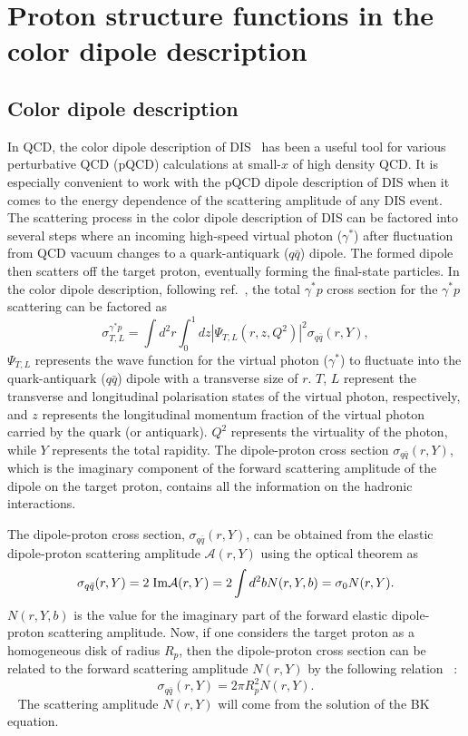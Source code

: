 \documentclass[12pt]{article}
\begin{document}
\section{Proton structure functions in the color dipole description}\label{sec:color}

\subsection{Color dipole description}
In QCD, the color dipole description of DIS~\cite{ad,ae,af} has been a useful tool for various perturbative QCD (pQCD) calculations at small-$x$ of high density QCD. It is especially convenient to work with the pQCD dipole description of DIS when it comes to the energy dependence of the scattering amplitude of any DIS event. The scattering process in the color dipole description of DIS can be factored into several steps where an incoming high-speed virtual photon ($\gamma^{\ast}$) after fluctuation from QCD vacuum changes to a quark-antiquark ($q\bar{q}$) dipole. The formed dipole then scatters off the target proton, eventually forming the final-state particles. In the color dipole description, following ref.~\cite{ag}, the total $\gamma^{\ast}p$ cross section for the $\gamma^{\ast}p$ scattering can be factored as
\begin{equation}
	\sigma^{\gamma^{\ast}p}_{T,L} =  \int d^2 r \int_{0} ^{1} dz |\Psi_{T,L}(r,z,Q^2)|^2 \sigma_{q\bar{q}}(r, Y) ,
\end{equation}
$\Psi_{T,L}$ represents the wave function for the virtual photon ($\gamma^{\ast}$) to fluctuate into the quark-antiquark ($q\bar{q}$) dipole with a transverse size of $r$. $T$, $L$ represent the transverse and longitudinal polarisation states of the virtual photon, respectively, and $z$ represents the longitudinal momentum fraction of the virtual photon carried by the quark (or antiquark). $Q^2$ represents the virtuality of the photon, while $Y$ represents the total rapidity. The dipole-proton cross section $\sigma_{q\bar{q}}(r, Y)$, which is the imaginary component of the forward scattering amplitude of the dipole on the target proton, contains all the information on the hadronic interactions.

The dipole-proton cross section, $\sigma_{q\bar{q}}(r, Y)$, can be obtained from the elastic dipole-proton scattering amplitude $\mathcal{A}(r, Y)$ using the optical theorem as~\cite{ah,ai}
\begin{equation}
	\sigma_{q\bar{q}}(r, Y) = 2 \hspace{1mm}\text{Im} \mathcal{A}(r, Y)=2\int d^2 b N(r,Y,b)=\sigma_0 N(r,Y).
\end{equation}
$N(r, Y, b)$ is the value for the imaginary part of the forward elastic dipole-proton scattering amplitude. Now, if one considers the target proton as a homogeneous disk of radius $R_p$, then the dipole-proton cross section can be related to the forward scattering amplitude $N(r, Y)$ by the following relation~\cite{ac} :
\begin{equation}
	\sigma_{q\bar{q}} (r,Y) = 2\pi R_p ^2 N (r,Y) .
\end{equation} 
The scattering amplitude $N(r,Y)$ will come from the solution of the BK equation.
\end{document}
